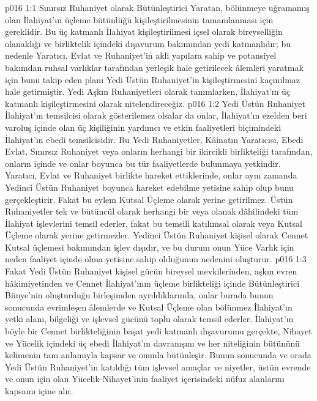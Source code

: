 \vs p016 1:1 Sınırsız Ruhaniyet olarak Bütünleştirici Yaratan, bölünmeye uğramamış olan İlahiyat’ın üçleme bütünlüğü kişileştirilmesinin tamamlanması için gereklidir. Bu üç katmanlı İlahiyat kişileştirilmesi içsel olarak bireyselliğin olanaklığı ve birliktelik içindeki dışavurum bakımından yedi katmanlıdır; bu nedenle Yaratıcı, Evlat ve Ruhaniyet’in akli yapılara sahip ve potansiyel bakımdan ruhsal varlıklar tarafından yerleşik hale getirilecek âlemleri yaratmak için bunu takip eden planı Yedi Üstün Ruhaniyet’in kişileştirmesini kaçınılmaz hale getirmiştir. Yedi Aşkın Ruhaniyetleri olarak tanımlarken, İlahiyat’ın üç katmanlı kişileştirmesini  olarak nitelendireceğiz.
\vs p016 1:2 Yedi Üstün Ruhaniyet  İlahiyat’ın temsilcisi olarak gösterilemez olsalar da onlar, İlahiyat’ın ezelden beri varoluş içinde olan üç kişiliğinin yardımcı ve etkin faaliyetleri biçimindeki İlahiyat’ın  ebedi temsilcisidir. Bu Yedi Ruhaniyetler, Kâinatın Yaratıcısı, Ebedi Evlat, Sınırsız Ruhaniyet veya onların herhangi bir ikircikli birlikteliği tarafından, onların içinde ve onlar boyunca bu tür faaliyetlerde bulunmaya yetkindir. Yaratıcı, Evlat ve Ruhaniyet birlikte hareket ettiklerinde, onlar aynı zamanda Yedinci Üstün Ruhaniyet boyunca hareket edebilme yetisine sahip olup bunu gerçekleştirir. Fakat bu eylem Kutsal Üçleme olarak yerine getirilmez. Üstün Ruhaniyetler tek ve bütüncül olarak herhangi bir veya olanak dâhilindeki tüm İlahiyat işlevlerini temsil ederler, fakat bu temsili katılımsal olarak veya Kutsal Üçleme olarak yerine getirmezler. Yedinci Üstün Ruhaniyet kişisel olarak Cennet Kutsal üçlemesi bakımından işlev dışıdır, ve bu durum onun  Yüce Varlık için neden faaliyet içinde olma yetisine sahip olduğunun nedenini oluşturur.
\vs p016 1:3 Fakat Yedi Üstün Ruhaniyet kişisel gücün bireysel mevkilerinden, aşkın evren hâkimiyetinden ve Cennet İlahiyat’ının üçleme birlikteliği içinde Bütünleştirici Bünye’nin oluşturduğu birleşimden ayrıldıklarında, onlar burada bunun sonucunda evrimleşen âlemlerde ve Kutsal Üçleme olan bölünmez İlahiyat’ın yetki alanı, bilgeliği ve işlevsel gücünü toplu olarak temsil ederler. İlahiyat’ın böyle bir Cennet birlikteliğinin başat yedi katmanlı dışavurumu gerçekte, Nihayet ve Yücelik içindeki üç ebedi İlahiyat’ın davranışını ve her niteliğinin bütününü kelimenin tam anlamıyla kapsar ve onunla bütünleşir. Bunun sonucunda ve orada Yedi Üstün Ruhaniyet’in katıldığı tüm işlevsel amaçlar ve niyetler, üstün evrende ve onun için olan Yücelik\hyp{}Nihayet’inin faaliyet içerisindeki nüfuz alanlarını kapsamı içine alır.
